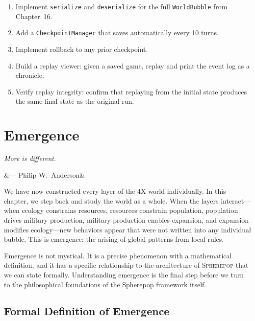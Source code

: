 \documentclass[11pt,a4paper,openany]{book}
\theoremstyle{plain}
\theoremstyle{definition}
\theoremstyle{remark}
\newenvironment{background}{%
  \begin{mdframed}[
    linecolor=sphereblue!40, backgroundcolor=sphereblue!5,
    linewidth=1pt, innertopmargin=8pt, innerbottommargin=8pt,
    innerleftmargin=10pt, innerrightmargin=10pt,
    skipabove=10pt, skipbelow=6pt
  ]%
  \setlength{\parindent}{0pt}%
  \noindent{\textcolor{sphereblue}{\textbf{Background}}}\par\smallskip\ignorespaces
}{\end{mdframed}}
\newenvironment{project}[1]{%
  \begin{tcolorbox}[
    title={\textbf{Project: #1}},
    colback=projectbg,
    colframe=sphereblue,
    fonttitle=\bfseries\color{white},
    coltitle=white,
    attach boxed title to top left={yshift=-2mm, xshift=4mm},
    boxed title style={colback=sphereblue, sharp corners},
    sharp corners,
    breakable,
    before upper={\normalfont\setlength{\parindent}{0pt}\tolerance=9999\hbadness=9999}
  ]
}{\end{tcolorbox}}
\newcommand{\Spbox}{\textsc{Spherepop}\xspace}
\newcommand{\Spbox}{\textbf{Spherepop}\xspace}
\newcommand{\chapterquote}[2]{%
  \par\vspace{0.8em}%
  \begin{flushright}%
    \begin{minipage}{0.65\textwidth}%
      {\itshape #1\par}%
      \ifx&#2&\else\vspace{0.3em}{\raggedleft\small--- #2\par}\fi%
    \end{minipage}%
  \end{flushright}%
  \vspace{0.8em}\par\noindent}
\begin{document}
\begin{project}{Complete Save/Load Architecture}
  \begin{enumerate}
    \item Implement \texttt{serialize} and \texttt{deserialize} for the
          full \texttt{WorldBubble} from Chapter~16.
    \item Add a \texttt{CheckpointManager} that saves automatically
          every 10 turns.
    \item Implement rollback to any prior checkpoint.
    \item Build a replay viewer: given a saved game, replay and print
          the event log as a chronicle.
    \item Verify replay integrity: confirm that replaying from the
          initial state produces the same final state as the original run.
  \end{enumerate}
\end{project}

\chapter{Emergence}
\label{ch:emergence}

\chapterquote{More is different.
}{--- Philip W.\ Anderson}

\begin{background}
  We have now constructed every layer of the 4X world individually.
  In this chapter, we step back and study the world as a whole. When
  the layers interact---when ecology constrains resources, resources
  constrain population, population drives military production, military
  production enables expansion, and expansion modifies ecology---new
  behaviors appear that were not written into any individual bubble.
  This is emergence: the arising of global patterns from local rules.

  Emergence is not mystical. It is a precise phenomenon with a
  mathematical definition, and it has a specific relationship to the
  architecture of \Spbox  that we can state formally. Understanding
  emergence is the final step before we turn to the philosophical
  foundations of the Spherepop framework itself.
\end{background}

\section{Formal Definition of Emergence}
\end{document}
